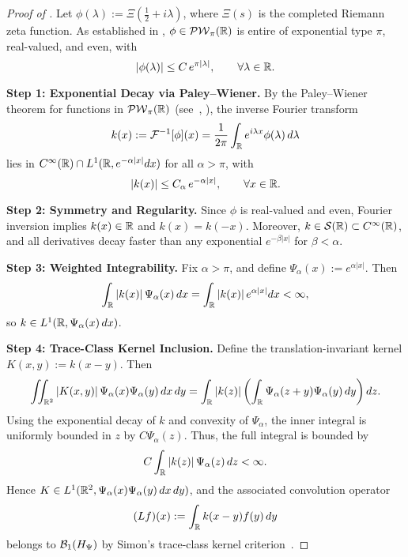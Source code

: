 \begin{proof}[Proof of ]
Let \( \phi(\lambda) := \Xi\left( \tfrac{1}{2} + i\lambda \right) \), where \( \Xi(s) \) is the completed Riemann zeta function. As established in , \( \phi \in \mathcal{PW}_{\pi}(\mathbb{R}) \) is entire of exponential type \( \pi \), real-valued, and even, with
\[
|\phi(\lambda)| \le C\, e^{\pi |\lambda|}, \qquad \forall \lambda \in \mathbb{R}.
\]

\medskip
\noindent\textbf{Step 1: Exponential Decay via Paley--Wiener.}
By the Paley--Wiener theorem for functions in \( \mathcal{PW}_{\pi}(\mathbb{R}) \) (see~\cite[Thm.~3.2.4]{Levin1996EntireLectures}, \cite[Ch.~IX.4]{ReedSimon1975II}), the inverse Fourier transform
\[
k(x) := \mathcal{F}^{-1}[\phi](x) = \frac{1}{2\pi} \int_{\mathbb{R}} e^{i\lambda x} \phi(\lambda)\, d\lambda
\]
lies in \( C^\infty(\mathbb{R}) \cap L^1(\mathbb{R}, e^{-\alpha |x|} dx) \) for all \( \alpha > \pi \), with
\[
|k(x)| \le C_\alpha\, e^{-\alpha |x|}, \qquad \forall x \in \mathbb{R}.
\]

\medskip
\noindent\textbf{Step 2: Symmetry and Regularity.}
Since \( \phi \) is real-valued and even, Fourier inversion implies \( k(x) \in \mathbb{R} \) and \( k(x) = k(-x) \). Moreover, \( k \in \mathcal{S}(\mathbb{R}) \subset C^\infty(\mathbb{R}) \), and all derivatives decay faster than any exponential \( e^{-\beta |x|} \) for \( \beta < \alpha \).

\medskip
\noindent\textbf{Step 3: Weighted Integrability.}
Fix \( \alpha > \pi \), and define \( \Psi_\alpha(x) := e^{\alpha |x|} \). Then
\[
\int_{\mathbb{R}} |k(x)|\, \Psi_\alpha(x)\, dx = \int_{\mathbb{R}} |k(x)|\, e^{\alpha |x|} dx < \infty,
\]
so \( k \in L^1(\mathbb{R}, \Psi_\alpha(x)\, dx) \).

\medskip
\noindent\textbf{Step 4: Trace-Class Kernel Inclusion.}
Define the translation-invariant kernel \( K(x,y) := k(x - y) \). Then
\[
\iint_{\mathbb{R}^2} |K(x,y)|\, \Psi_\alpha(x)\Psi_\alpha(y)\, dx\, dy
= \int_{\mathbb{R}} |k(z)| \left( \int_{\mathbb{R}} \Psi_\alpha(z + y)\Psi_\alpha(y)\, dy \right) dz.
\]
Using the exponential decay of \( k \) and convexity of \( \Psi_\alpha \), the inner integral is uniformly bounded in \( z \) by \( C \Psi_\alpha(z) \). Thus, the full integral is bounded by
\[
C \int_{\mathbb{R}} |k(z)|\, \Psi_\alpha(z)\, dz < \infty.
\]
Hence \( K \in L^1(\mathbb{R}^2, \Psi_\alpha(x)\Psi_\alpha(y)\, dx\, dy) \), and the associated convolution operator
\[
(L f)(x) := \int_{\mathbb{R}} k(x - y) f(y)\, dy
\]
belongs to \( \mathcal{B}_1(H_{\Psi}) \) by Simon’s trace-class kernel criterion~\cite[Thm.~4.2]{Simon2005TraceIdeals}.
\end{proof}
